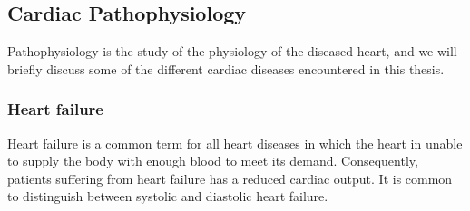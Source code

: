 



\subsection{Cardiac Pathophysiology}
Pathophysiology is the study of the physiology of the diseased heart,
and we will briefly discuss some of the different cardiac diseases
encountered in this thesis. 


\subsubsection{Heart failure}
Heart failure is a common term for all heart diseases in which the
heart in unable to supply the body with enough blood to meet its demand.
Consequently, patients suffering from heart failure has a reduced
cardiac output. It is common to distinguish between systolic and
diastolic heart failure. 

